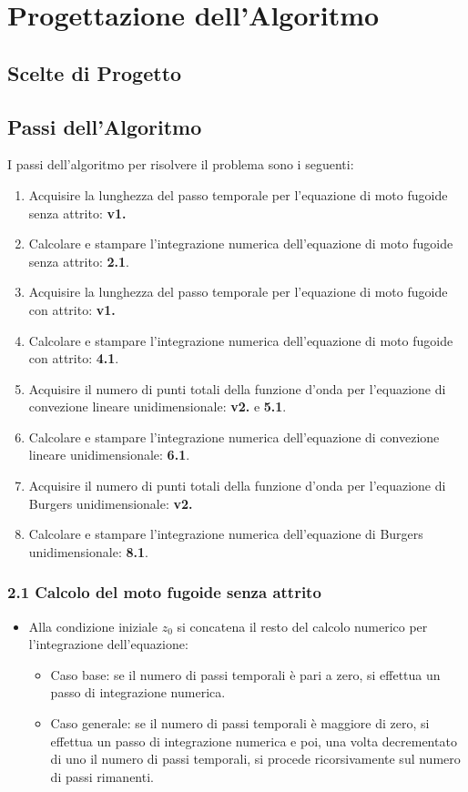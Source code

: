 \section{Progettazione dell'Algoritmo}
\subsection{Scelte di Progetto}

\subsection{Passi dell'Algoritmo}
I passi dell'algoritmo per risolvere il problema sono i seguenti:

\begin{enumerate}
\item Acquisire la lunghezza del passo temporale per l'equazione di moto fugoide senza attrito: \textbf{v1.}
\item Calcolare e stampare l'integrazione numerica dell'equazione di moto fugoide senza attrito: \textbf{2.1}.
\item Acquisire la lunghezza del passo temporale per l'equazione di moto fugoide con attrito: \textbf{v1.}
\item Calcolare e stampare l'integrazione numerica dell'equazione di moto fugoide con attrito: \textbf{4.1}.
\item Acquisire il numero di punti totali della funzione d'onda per l'equazione di convezione lineare unidimensionale: \textbf{v2.} e \textbf{5.1}.
\item Calcolare e stampare l'integrazione numerica dell'equazione di convezione lineare unidimensionale: \textbf{6.1}.
\item Acquisire il numero di punti totali della funzione d'onda per l'equazione di Burgers unidimensionale: \textbf{v2.}
\item Calcolare e stampare l'integrazione numerica dell'equazione di Burgers unidimensionale: \textbf{8.1}.
\end{enumerate}

\subsubsection*{2.1 Calcolo del moto fugoide senza attrito} 
\begin{itemize}
\item Alla condizione iniziale $z_0$ si concatena il resto del calcolo numerico per l'integrazione dell'equazione:
\begin{itemize}
\item Caso base: se il numero di passi temporali è pari a zero, si effettua un passo di integrazione numerica.
\item Caso generale: se il numero di passi temporali è maggiore di zero, si effettua un passo di integrazione numerica e poi, una volta decrementato di uno il numero di passi temporali, si procede ricorsivamente sul numero di passi rimanenti. 
\end{itemize}
\end{itemize}

